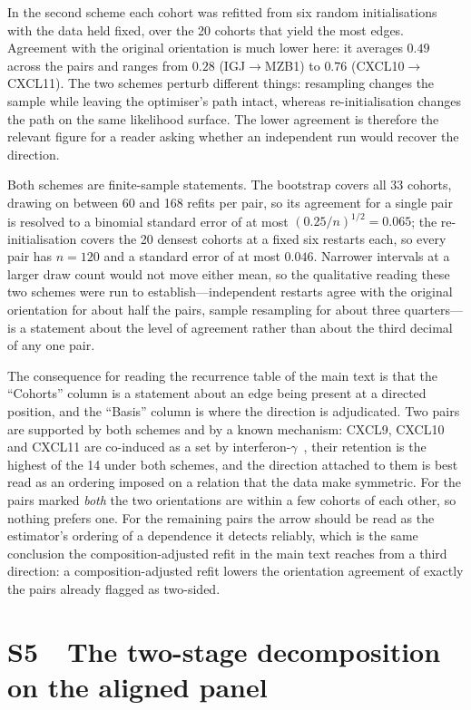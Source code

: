 \documentclass[11pt]{article}
\begin{document}
In the second scheme each cohort was refitted from six random initialisations with the data held fixed, over the 20 cohorts that yield the most edges. Agreement with the original orientation is much lower here: it averages $0.49$ across the pairs and ranges from $0.28$ (IGJ$\rightarrow$MZB1) to $0.76$ (CXCL10$\rightarrow$CXCL11). The two schemes perturb different things: resampling changes the sample while leaving the optimiser's path intact, whereas re-initialisation changes the path on the same likelihood surface. The lower agreement is therefore the relevant figure for a reader asking whether an independent run would recover the direction.

Both schemes are finite-sample statements. The bootstrap covers all 33 cohorts, drawing on between 60 and 168 refits per pair, so its agreement for a single pair is resolved to a binomial standard error of at most $(0.25/n)^{1/2} = 0.065$; the re-initialisation covers the 20 densest cohorts at a fixed six restarts each, so every pair has $n = 120$ and a standard error of at most $0.046$. Narrower intervals at a larger draw count would not move either mean, so the qualitative reading these two schemes were run to establish---independent restarts agree with the original orientation for about half the pairs, sample resampling for about three quarters---is a statement about the level of agreement rather than about the third decimal of any one pair.

The consequence for reading the recurrence table of the main text is that the ``Cohorts'' column is a statement about an edge being present at a directed position, and the ``Basis'' column is where the direction is adjudicated. Two pairs are supported by both schemes and by a known mechanism: CXCL9, CXCL10 and CXCL11 are co-induced as a set by interferon-$\gamma$~\citep{groom2011cxcr3,metzemaekers2017nonredundant}, their retention is the highest of the 14 under both schemes, and the direction attached to them is best read as an ordering imposed on a relation that the data make symmetric. For the pairs marked \emph{both} the two orientations are within a few cohorts of each other, so nothing prefers one. For the remaining pairs the arrow should be read as the estimator's ordering of a dependence it detects reliably, which is the same conclusion the composition-adjusted refit in the main text reaches from a third direction: a composition-adjusted refit lowers the orientation agreement of exactly the pairs already flagged as two-sided.

\section*{S5\ \ The two-stage decomposition on the aligned panel}
\end{document}
